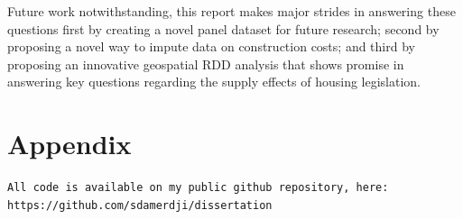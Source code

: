 \documentclass[a4paper,12pt]{article}
\begin{document}
Future work notwithstanding, this report makes major strides in answering these questions first by creating a novel panel dataset for future research; second by proposing a novel way to impute data on construction costs; and third by proposing an innovative geospatial RDD analysis that shows promise in answering key questions regarding the supply effects of housing legislation.


\printbibliography

\clearpage
\section*{Appendix}
\begin{verbatim}
All code is available on my public github repository, here: https://github.com/sdamerdji/dissertation
\end{verbatim}
\end{document}
